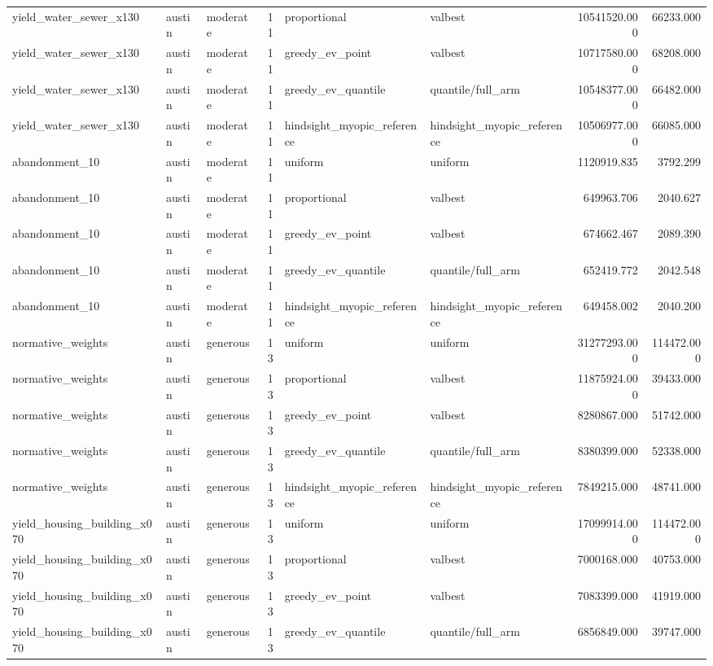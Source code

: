 \begin{tabular}{lllrllrr}
yield\_water\_sewer\_x130 & austin & moderate & 11 & proportional & valbest & 10541520.000 & 66233.000 \\
yield\_water\_sewer\_x130 & austin & moderate & 11 & greedy\_ev\_point & valbest & 10717580.000 & 68208.000 \\
yield\_water\_sewer\_x130 & austin & moderate & 11 & greedy\_ev\_quantile & quantile/full\_arm & 10548377.000 & 66482.000 \\
yield\_water\_sewer\_x130 & austin & moderate & 11 & hindsight\_myopic\_reference & hindsight\_myopic\_reference & 10506977.000 & 66085.000 \\
abandonment\_10 & austin & moderate & 11 & uniform & uniform & 1120919.835 & 3792.299 \\
abandonment\_10 & austin & moderate & 11 & proportional & valbest & 649963.706 & 2040.627 \\
abandonment\_10 & austin & moderate & 11 & greedy\_ev\_point & valbest & 674662.467 & 2089.390 \\
abandonment\_10 & austin & moderate & 11 & greedy\_ev\_quantile & quantile/full\_arm & 652419.772 & 2042.548 \\
abandonment\_10 & austin & moderate & 11 & hindsight\_myopic\_reference & hindsight\_myopic\_reference & 649458.002 & 2040.200 \\
normative\_weights & austin & generous & 13 & uniform & uniform & 31277293.000 & 114472.000 \\
normative\_weights & austin & generous & 13 & proportional & valbest & 11875924.000 & 39433.000 \\
normative\_weights & austin & generous & 13 & greedy\_ev\_point & valbest & 8280867.000 & 51742.000 \\
normative\_weights & austin & generous & 13 & greedy\_ev\_quantile & quantile/full\_arm & 8380399.000 & 52338.000 \\
normative\_weights & austin & generous & 13 & hindsight\_myopic\_reference & hindsight\_myopic\_reference & 7849215.000 & 48741.000 \\
yield\_housing\_building\_x070 & austin & generous & 13 & uniform & uniform & 17099914.000 & 114472.000 \\
yield\_housing\_building\_x070 & austin & generous & 13 & proportional & valbest & 7000168.000 & 40753.000 \\
yield\_housing\_building\_x070 & austin & generous & 13 & greedy\_ev\_point & valbest & 7083399.000 & 41919.000 \\
yield\_housing\_building\_x070 & austin & generous & 13 & greedy\_ev\_quantile & quantile/full\_arm & 6856849.000 & 39747.000 \\

\end{tabular}
